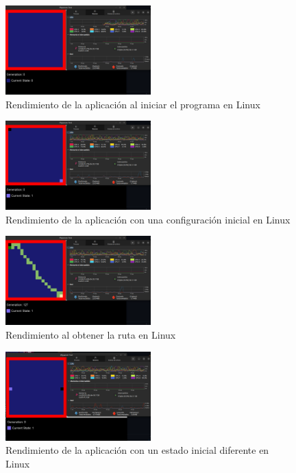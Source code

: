     \vskip 0.5cm
    \begin{figure}[htbp]
        \centering
        \includegraphics[width=0.5\textwidth]{./images/Pruebas/simulador/image029.png}
        \caption{Rendimiento de la aplicaci\'on al iniciar el programa en Linux}
        \label{fig:Ruta 11}
    \end{figure}
    \vskip 0.5cm
    \begin{figure}[htbp]
        \centering
        \includegraphics[width=0.5\textwidth]{./images/Pruebas/simulador/image031.png}
        \caption{Rendimiento de la aplicaci\'on con una configuraci\'on inicial en Linux}
        \label{fig:Ruta 12}
    \end{figure}
    \vskip 0.5cm
    \begin{figure}[htbp]
        \centering
        \includegraphics[width=0.5\textwidth]{./images/Pruebas/simulador/image033.png}
        \caption{Rendimiento al obtener la ruta en Linux}
        \label{fig:Ruta 13}
    \end{figure}
    \vskip 0.5cm
    \begin{figure}[htbp]
        \centering
        \includegraphics[width=0.5\textwidth]{./images/Pruebas/simulador/image035.png}
        \caption{Rendimiento de la aplicaci\'on con un estado inicial diferente en Linux}
        \label{fig:Ruta 14}
    \end{figure}
